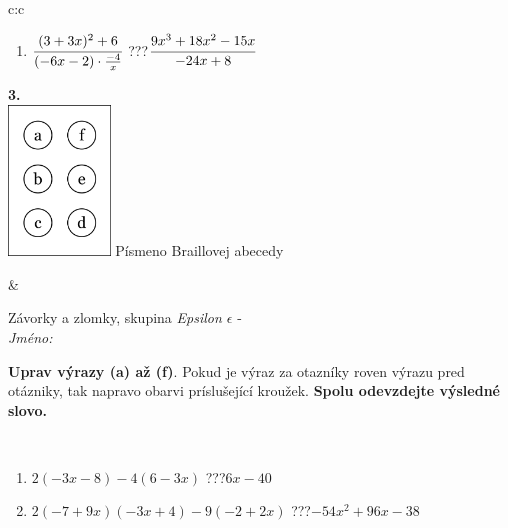 \documentclass[10pt]{report}
\begin{document}
\begin{tabular}{c:c}
\begin{minipage}[c][104.5mm][t]{0.5\linewidth}
\begin{center}
\begin{minipage}{0.79\linewidth}
\begin{center}
\begin{varwidth}{\linewidth}
\begin{enumerate}
\item $\cfrac{(3+3x)^2+6}{(-6x-2)\cdot\frac{-4}{x}}$\quad \dotfill\; ???\;\dotfill \quad $\cfrac{9x^3+18x^2-15x}{-24x+8}$
\end{enumerate}
\end{varwidth}
\end{center}
\end{minipage}
\begin{minipage}{0.20\linewidth}
\begin{center}
{\Huge\bfseries 3.} \\[2mm]
\includegraphics[height=40mm]{../images/braille.png}
{\small Písmeno Braillovej abecedy}
\end{center}
\end{minipage}
\end{center}
\end{minipage}
&
\begin{minipage}[c][104.5mm][t]{0.5\linewidth}
\begin{center}
\vspace{7mm}
{\huge Závorky a zlomky, skupina \textit{Epsilon $\epsilon$} -}\\[5mm]
\textit{Jméno:}\phantom{xxxxxxxxxxxxxxxxxxxxxxxxxxxxxxxxxxxxxxxxxxxxxxxxxxxxxxxxxxxxxxxxx}\\[5mm]
\begin{minipage}{0.95\linewidth}
\begin{center}
\textbf{Uprav výrazy (a) až (f)}. Pokud je výraz za otazníky roven výrazu pred otázniky, tak napravo obarvi príslušející kroužek. \textbf{Spolu odevzdejte výsledné slovo.}
\end{center}
\end{minipage}
\\[1mm]
\begin{minipage}{0.79\linewidth}
\begin{center}
\begin{varwidth}{\linewidth}
\begin{enumerate}
\normalsize
\item $2(-3x-8)-4(6-3x)$\quad \dotfill\; ???\;\dotfill \quad $6x-40$
\item $2(-7+9x)(-3x+4)-9(-2+2x)$\quad \dotfill\; ???\;\dotfill \quad $-54x^2+96x-38$

\end{enumerate}
\end{varwidth}
\end{center}
\end{minipage}
\end{center}
\end{minipage}
\end{tabular}
\end{document}
